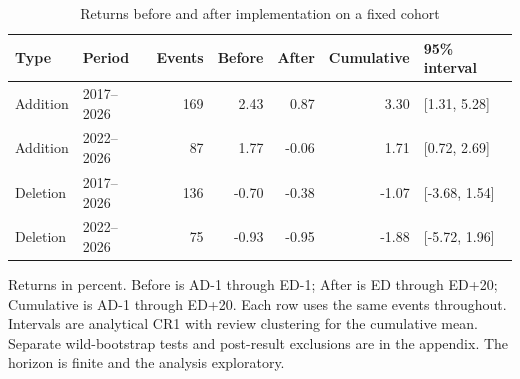 \begin{table}[!htbp]
\centering
\caption{Returns before and after implementation on a fixed cohort}\label{tab:horizon_main}
\small
\setlength{\tabcolsep}{5pt}
\begin{tabular}{llrrrrl}
\toprule
Type & Period & Events & Before & After & Cumulative & 95\% interval \\
\midrule
Addition & 2017--2026 & 169 & 2.43 & 0.87 & 3.30 & [1.31, 5.28] \\
Addition & 2022--2026 & 87 & 1.77 & -0.06 & 1.71 & [0.72, 2.69] \\
Deletion & 2017--2026 & 136 & -0.70 & -0.38 & -1.07 & [-3.68, 1.54] \\
Deletion & 2022--2026 & 75 & -0.93 & -0.95 & -1.88 & [-5.72, 1.96] \\
\bottomrule
\end{tabular}
\begin{minipage}{\linewidth}\footnotesize\vspace{5pt}
Returns in percent. Before is AD-1 through ED-1; After is ED through ED+20; Cumulative is AD-1 through ED+20. Each row uses the same events throughout. Intervals are analytical CR1 with review clustering for the cumulative mean. Separate wild-bootstrap tests and post-result exclusions are in the appendix. The horizon is finite and the analysis exploratory.
\end{minipage}
\end{table}
